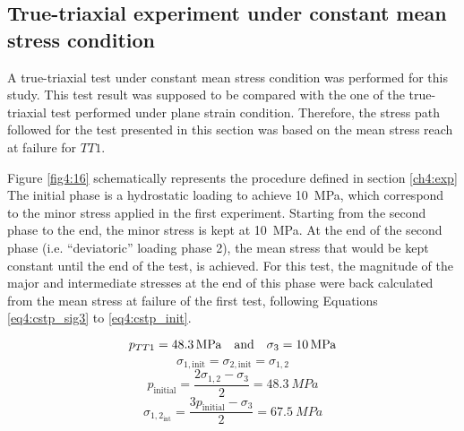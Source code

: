 \subsection{True-triaxial experiment under constant mean stress condition}

A true-triaxial test under constant mean stress condition was performed for this study. This test result was supposed to be compared with the one of the true-triaxial test performed under plane strain condition. Therefore, the stress path followed for the test presented in this section was based on the mean stress reach at failure for $TT1$.

Figure \ref{fig4:16} schematically represents the procedure defined in section \ref{ch4:exp} The initial phase is a hydrostatic loading to achieve \SI{10}{MPa}, which correspond to the minor stress applied in the first experiment. Starting from the second phase to the end, the minor stress is kept at \SI{10}{MPa}. At the end of the second phase (i.e. “deviatoric” loading phase 2), the mean stress that would be kept constant until the end of the test, is achieved. For this test, the magnitude of the major and intermediate stresses at the end of this phase were back calculated from the mean stress at failure of the first test, following Equations \ref{eq4:cstp_sig3} to \ref{eq4:cstp_init}.

\begin{equation}\label{eq4:cstp_sig3}
    p_{TT1} = \SI{48.3}{MPa} \quad \textmd{and} \quad \sigma_3 = \SI{10}{MPa}
\end{equation}
\begin{equation}
    \sigma_{1,\text{init}} = \sigma_{2,\text{init}} = \sigma_{1,2}
\end{equation}
\begin{equation}
    p_\text{initial} = \frac{2\sigma_{1,2}-\sigma_3}{2} = \SI{48.3}{MPa}
\end{equation}
\begin{equation}\label{eq4:cstp_init}
    \sigma_{1,2_{\text{int}}} = \frac{3p_\text{initial}-\sigma_3}{2} = \SI{67.5}{MPa}
\end{equation}
    

